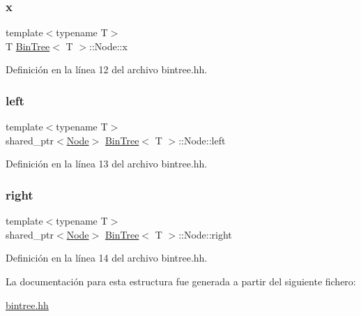 \subsubsection{\texorpdfstring{x}{x}}
{\footnotesize\ttfamily template$<$typename T$>$ \\
T \hyperlink{class_bin_tree}{Bin\+Tree}$<$ T $>$\+::Node\+::x}



Definición en la línea 12 del archivo bintree.\+hh.

\mbox{\label{struct_bin_tree_1_1_node_a265a6367635a38838e6a6366564be78d}} 
\subsubsection{\texorpdfstring{left}{left}}
{\footnotesize\ttfamily template$<$typename T$>$ \\
shared\+\_\+ptr$<$\hyperlink{struct_bin_tree_1_1_node}{Node}$>$ \hyperlink{class_bin_tree}{Bin\+Tree}$<$ T $>$\+::Node\+::left}



Definición en la línea 13 del archivo bintree.\+hh.

\mbox{\label{struct_bin_tree_1_1_node_a6df770137090da60cd0376ce06893cbd}} 
\subsubsection{\texorpdfstring{right}{right}}
{\footnotesize\ttfamily template$<$typename T$>$ \\
shared\+\_\+ptr$<$\hyperlink{struct_bin_tree_1_1_node}{Node}$>$ \hyperlink{class_bin_tree}{Bin\+Tree}$<$ T $>$\+::Node\+::right}



Definición en la línea 14 del archivo bintree.\+hh.



La documentación para esta estructura fue generada a partir del siguiente fichero\+:\begin{DoxyCompactItemize}
\item 
\hyperlink{bintree_8hh}{bintree.\+hh}\end{DoxyCompactItemize}

